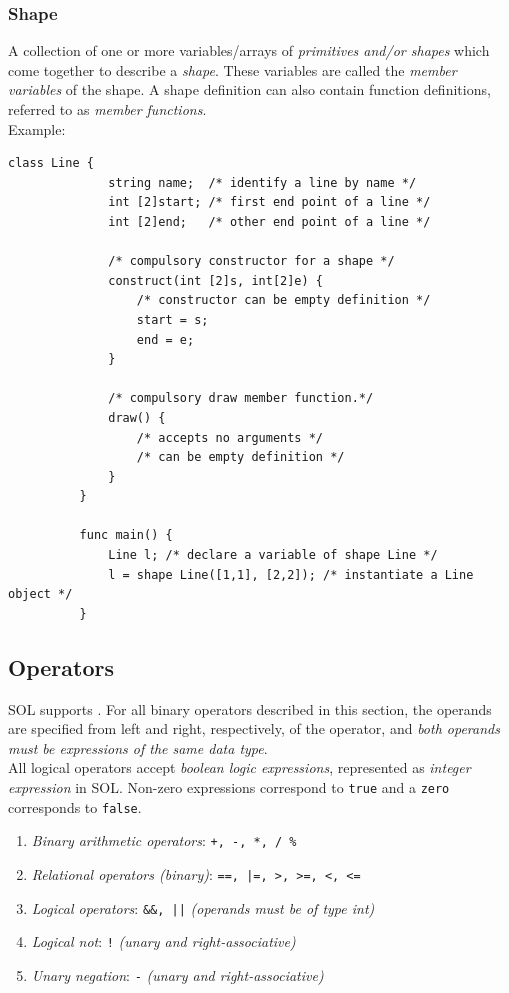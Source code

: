 \documentclass[letterpaper,12pt]{report}
\begin{document}
      \subsubsection{Shape}
        A collection of one or more variables/arrays of \textit{primitives and/or shapes} which come together to describe a \textit{shape}. These variables are called the \textit{member variables} of the shape. A shape definition can also contain function definitions, referred to as \textit{member functions}.\\
        Example:\\
        \begin{lstlisting}[style=sol]
          class Line {
              string name;  /* identify a line by name */
              int [2]start; /* first end point of a line */
              int [2]end;   /* other end point of a line */

              /* compulsory constructor for a shape */
              construct(int [2]s, int[2]e) {
                  /* constructor can be empty definition */
                  start = s;
                  end = e;
              }

              /* compulsory draw member function.*/
              draw() {
                  /* accepts no arguments */
                  /* can be empty definition */
              }
          }

          func main() {
              Line l; /* declare a variable of shape Line */
              l = shape Line([1,1], [2,2]); /* instantiate a Line object */
          }
        \end{lstlisting}

    \subsection{Operators}
    SOL supports . For all binary operators described in this section, the operands are specified from left and right, respectively, of the operator, and \textit{both operands must be expressions of the same data type}.\\
    All logical operators accept \textit{boolean logic expressions}, represented as \textit{integer expression} in SOL. Non-zero expressions correspond to \texttt{true} and a \texttt{zero} corresponds to \texttt{false}. 

    \begin{enumerate}
      \itemsep 0em
      \item \textit{Binary arithmetic operators}: \texttt{+, -, *, / \%}
      \item \textit{Relational operators (binary)}: \texttt{==, |=, >, >=, <, <=}
      \item \textit{Logical operators}: \texttt{\&\&, ||} \textit{(operands must be of type int)}
      \item \textit{Logical not}: \texttt{!} \textit{(unary and right-associative)}
      \item \textit{Unary negation}: \texttt{-} \textit{(unary and right-associative)}
    \end{enumerate}
\end{document}
